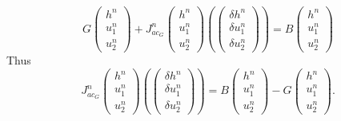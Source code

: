 \documentclass[a4paper, 11pt]{report}
\begin{document}
\begin{equation*}
G\begin{pmatrix}h^{n}\\u_1^{n}\\u_2^{n}\end{pmatrix}+J_{ac_G}^n\begin{pmatrix}h^n\\u_1^n\\u_2^n\end{pmatrix}\left(\begin{pmatrix}\delta h^n\\\delta u_1^n\\\delta u_2^n\end{pmatrix}\right)=B\begin{pmatrix}h^n\\u_1^n\\u_2^n\end{pmatrix}
\end{equation*}
Thus
\begin{equation*}
J_{ac_G}^n\begin{pmatrix}h^n\\u_1^n\\u_2^n\end{pmatrix}\left(\begin{pmatrix}\delta h^n\\\delta u_1^n\\\delta u_2^n\end{pmatrix}\right)=B\begin{pmatrix}h^n\\u_1^n\\u_2^n\end{pmatrix}-G\begin{pmatrix}h^{n}\\u_1^{n}\\u_2^{n}\end{pmatrix}.
\end{equation*}
\end{document}
